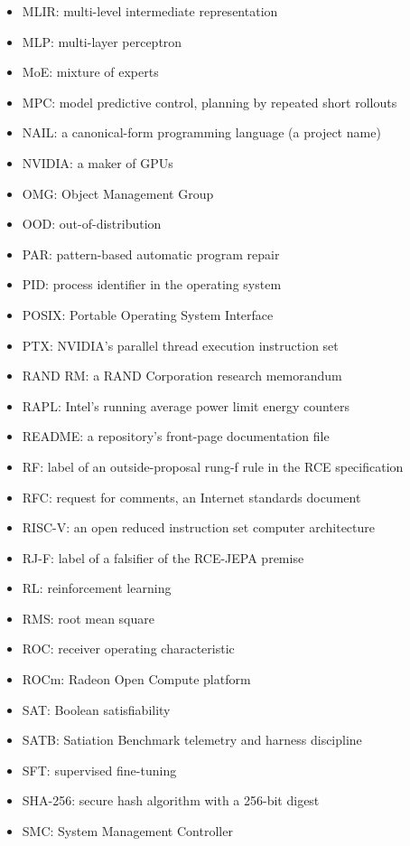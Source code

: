 \documentclass[10pt,letterpaper]{article}
\begin{document}
\begin{itemize}
  MLIPS: million logical inferences per second
\item
  MLIR: multi-level intermediate representation
\item
  MLP: multi-layer perceptron
\item
  MoE: mixture of experts
\item
  MPC: model predictive control, planning by repeated short rollouts
\item
  NAIL: a canonical-form programming language (a project name)
\item
  NVIDIA: a maker of GPUs
\item
  OMG: Object Management Group
\item
  OOD: out-of-distribution
\item
  PAR: pattern-based automatic program repair
\item
  PID: process identifier in the operating system
\item
  POSIX: Portable Operating System Interface
\item
  PTX: NVIDIA's parallel thread execution instruction set
\item
  RAND RM: a RAND Corporation research memorandum
\item
  RAPL: Intel's running average power limit energy counters
\item
  README: a repository's front-page documentation file
\item
  RF: label of an outside-proposal rung-f rule in the RCE specification
\item
  RFC: request for comments, an Internet standards document
\item
  RISC-V: an open reduced instruction set computer architecture
\item
  RJ-F: label of a falsifier of the RCE-JEPA premise
\item
  RL: reinforcement learning
\item
  RMS: root mean square
\item
  ROC: receiver operating characteristic
\item
  ROCm: Radeon Open Compute platform
\item
  SAT: Boolean satisfiability
\item
  SATB: Satiation Benchmark telemetry and harness discipline
\item
  SFT: supervised fine-tuning
\item
  SHA-256: secure hash algorithm with a 256-bit digest
\item
  SMC: System Management Controller

\end{itemize}
\end{document}
